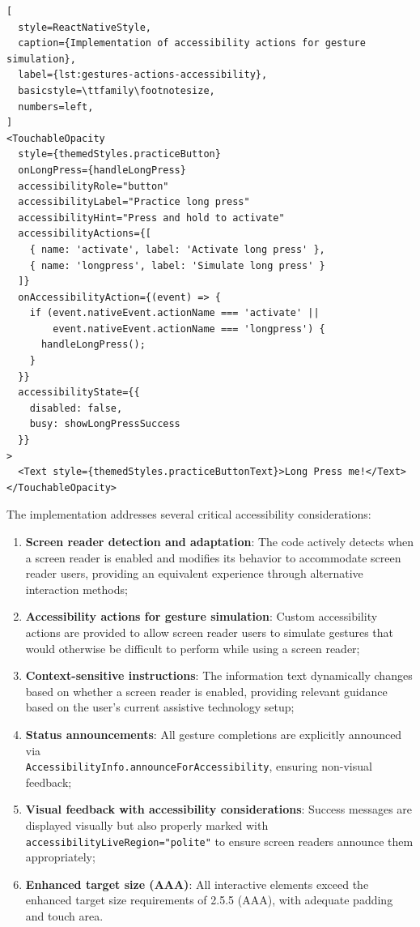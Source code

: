 \begin{lstlisting}[
  style=ReactNativeStyle,
  caption={Implementation of accessibility actions for gesture simulation},
  label={lst:gestures-actions-accessibility},
  basicstyle=\ttfamily\footnotesize,
  numbers=left,
]
<TouchableOpacity
  style={themedStyles.practiceButton}
  onLongPress={handleLongPress}
  accessibilityRole="button"
  accessibilityLabel="Practice long press"
  accessibilityHint="Press and hold to activate"
  accessibilityActions={[
    { name: 'activate', label: 'Activate long press' },
    { name: 'longpress', label: 'Simulate long press' }
  ]}
  onAccessibilityAction={(event) => {
    if (event.nativeEvent.actionName === 'activate' ||
        event.nativeEvent.actionName === 'longpress') {
      handleLongPress();
    }
  }}
  accessibilityState={{
    disabled: false,
    busy: showLongPressSuccess
  }}
>
  <Text style={themedStyles.practiceButtonText}>Long Press me!</Text>
</TouchableOpacity>
\end{lstlisting}
\FloatBarrier

The implementation addresses several critical accessibility considerations:

\begin{enumerate}
    \item \textbf{Screen reader detection and adaptation}: The code actively detects when a screen reader is enabled and modifies its behavior to accommodate screen reader users, providing an equivalent experience through alternative interaction methods;
    
    \item \textbf{Accessibility actions for gesture simulation}: Custom accessibility actions are provided to allow screen reader users to simulate gestures that would otherwise be difficult to perform while using a screen reader;
    
    \item \textbf{Context-sensitive instructions}: The information text dynamically changes based on whether a screen reader is enabled, providing relevant guidance based on the user's current assistive technology setup;
    
    \item \textbf{Status announcements}: All gesture completions are explicitly announced via \\\texttt{AccessibilityInfo.announceForAccessibility}, ensuring non-visual feedback;
    
    \item \textbf{Visual feedback with accessibility considerations}: Success messages are displayed visually but also properly marked with \texttt{accessibilityLiveRegion="polite"} to ensure screen readers announce them appropriately;
    
    \item \textbf{Enhanced target size (AAA)}: All interactive elements exceed the enhanced target size requirements of 2.5.5 (AAA), with adequate padding and touch area.
\end{enumerate}

